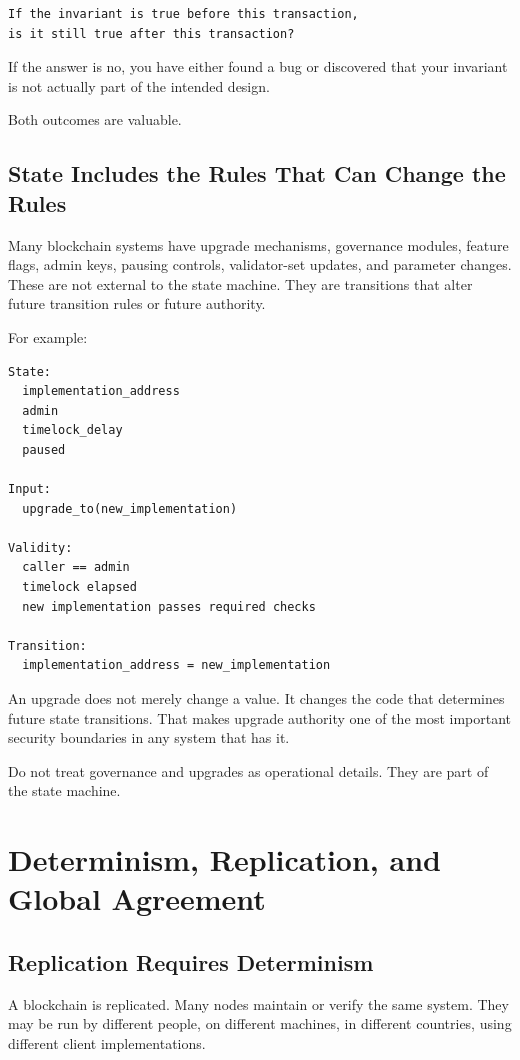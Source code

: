 \begin{lstlisting}
If the invariant is true before this transaction,
is it still true after this transaction?
\end{lstlisting}

If the answer is no, you have either found a bug or discovered that your
invariant is not actually part of the intended design.

Both outcomes are valuable.

\subsection{State Includes the Rules That Can Change the Rules}

Many blockchain systems have upgrade mechanisms, governance modules,
feature flags, admin keys, pausing controls, validator-set updates, and
parameter changes. These are not external to the state machine. They are
transitions that alter future transition rules or future authority.

For example:

\begin{lstlisting}
State:
  implementation_address
  admin
  timelock_delay
  paused

Input:
  upgrade_to(new_implementation)

Validity:
  caller == admin
  timelock elapsed
  new implementation passes required checks

Transition:
  implementation_address = new_implementation
\end{lstlisting}

An upgrade does not merely change a value. It changes the code that
determines future state transitions. That makes upgrade authority one of
the most important security boundaries in any system that has it.

Do not treat governance and upgrades as operational details. They are
part of the state machine.

\section{Determinism, Replication, and Global Agreement}

\subsection{Replication Requires Determinism}

A blockchain is replicated. Many nodes maintain or verify the same
system. They may be run by different people, on different machines, in
different countries, using different client implementations.

